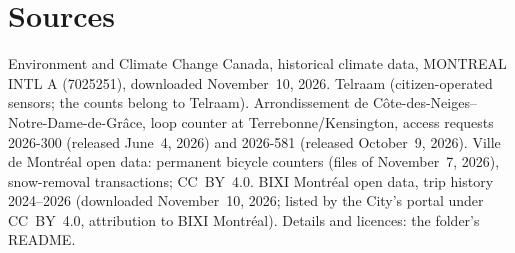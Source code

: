 \documentclass[11pt,a4paper]{article}
\begin{document}
\section{Sources}
Environment and Climate Change Canada, historical climate data, MONTREAL INTL A (7025251), downloaded November~10, 2026. Telraam (citizen-operated sensors; the counts belong to Telraam). Arrondissement de Côte-des-Neiges--Notre-Dame-de-Grâce, loop counter at Terrebonne/Kensington, access requests 2026-300 (released June~4, 2026) and 2026-581 (released October~9, 2026). Ville de Montréal open data: permanent bicycle counters (files of November~7, 2026), snow-removal transactions; CC~BY~4.0. BIXI Montréal open data, trip history 2024--2026 (downloaded November~10, 2026; listed by the City\textquoteright{}s portal under CC~BY~4.0, attribution to BIXI Montréal). Details and licences: the folder\textquoteright{}s README.
\end{document}
